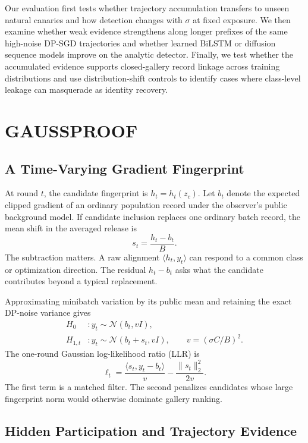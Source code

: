 \documentclass[conference]{IEEEtran}
\newcommand{\Normal}{\mathcal{N}}
\begin{document}
Our evaluation first tests whether trajectory accumulation transfers to unseen natural canaries and how detection changes with $\sigma$ at fixed exposure. We then examine whether weak evidence strengthens along longer prefixes of the same high-noise DP-SGD trajectories and whether learned BiLSTM or diffusion sequence models improve on the analytic detector. Finally, we test whether the accumulated evidence supports closed-gallery record linkage across training distributions and use distribution-shift controls to identify cases where class-level leakage can masquerade as identity recovery.

\section{GAUSSPROOF}

\subsection{A Time-Varying Gradient Fingerprint}

At round $t$, the candidate fingerprint is $h_t=h_t(z_c)$. Let $b_t$ denote the expected clipped gradient of an ordinary population record under the observer's public background model. If candidate inclusion replaces one ordinary batch record, the mean shift in the averaged release is
\begin{equation}
s_t=\frac{h_t-b_t}{B}.
\label{eq:shift}
\end{equation}
The subtraction matters. A raw alignment $\langle h_t,y_t\rangle$ can respond to a common class or optimization direction. The residual $h_t-b_t$ asks what the candidate contributes beyond a typical replacement.

Approximating minibatch variation by its public mean and retaining the exact DP-noise variance gives
\begin{align}
H_0 &: y_t\sim\Normal(b_t,vI),\\
H_{1,t} &: y_t\sim\Normal(b_t+s_t,vI),
\qquad v=(\sigma C/B)^2.
\end{align}
The one-round Gaussian log-likelihood ratio (LLR) is
\begin{equation}
\ell_t=\frac{\langle s_t,y_t-b_t\rangle}{v}
-\frac{\lVert s_t\rVert_2^2}{2v}.
\label{eq:llr}
\end{equation}
The first term is a matched filter. The second penalizes candidates whose large fingerprint norm would otherwise dominate gallery ranking.

\subsection{Hidden Participation and Trajectory Evidence}
\end{document}
